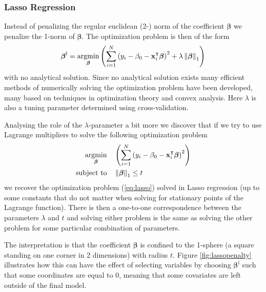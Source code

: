 \documentclass[a4paper, 12pt]{scrartcl}
\newcommand{\bfbeta}{\boldsymbol{\beta}}
\begin{document}

\subsubsection*{Lasso Regression}
\begin{algorithm}
Instead of penalizing the regular euclidean (2-) norm of the coefficient $\bfbeta$ we penalize the 1-norm of $\bfbeta$.
The optimization problem is then of the form
\begin{equation}\label{eq:lasso}
	\bfbeta^\mathrm{l}=\operatornamewithlimits{argmin}_{\bfbeta}\left(\sum_{i=1}^{N}\left(y_i-\beta_0-\mathbf{x}_i^\intercal\bfbeta\right)^2+\lambda\left\|\bfbeta\right\|_1\right)
\end{equation}
with no analytical solution.
Since no analytical solution exists many efficient methods of numerically solving the optimization problem have been developed, many based on techniques in optimization theory and convex analysis.
Here $\lambda$ is also a tuning parameter determined using cross-validation.
\end{algorithm}

Analysing the role of the $\lambda$-parameter a bit more we discover that if we try to use Lagrange multipliers to solve the following optimization problem
\begin{equation*}
	\begin{aligned}
	\operatornamewithlimits{argmin}_{\bfbeta} & & &\left(\sum_{i=1}^{N}\left(y_i-\beta_0-\mathbf{x}_i^\intercal\bfbeta\right)^2\right)\\
	\text{subject to} & & & \left\|\bfbeta\right\|_1 \leq t
	\end{aligned}
\end{equation*}
we recover the optimization problem (\ref{eq:lasso}) solved in Lasso regression (up to some constants that do not matter when solving for stationary points of the Lagrange function).
There is then a one-to-one correspondence between the parameters $\lambda$ and $t$ and solving either problem is the same as solving the other problem for some particular combination of parameters.

The interpretation is that the coefficient $\bfbeta$ is confined to the 1-sphere (a square standing on one corner in 2 dimensions) with radius $t$.
Figure \ref{fig:lassopenalty} illustrates how this can have the effect of selecting variables by choosing $\bfbeta^\mathrm{l}$ such that some coordinates are equal to 0, meaning that some covariates are left outside of the final model.
\end{document}
